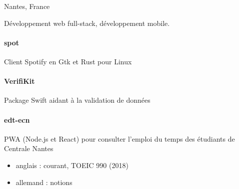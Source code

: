 \documentclass{cv}
\begin{document}
\begin{minipage}[t]{0.28\textwidth}%


	 Nantes, France
	\newline{} %
	\newline{} \href{mailto:%
	}{\link{%
	}}%
	\newline{} \href{https://github.com/xou816}{} 


	Développement web full-stack, développement mobile.

	\begin{center}
	  
	  
	  
	  
	  
	\end{center}

	\raggedright
	\paragraph{ spot} Client Spotify en Gtk et Rust pour Linux
	\paragraph{ VerifiKit} Package Swift aidant à la validation de données
	\paragraph{ edt-ecn} PWA (Node.js et React) pour consulter l'emploi du temps des étudiants de Centrale Nantes


	\begin{itemize}
	\item anglais : courant, TOEIC 990 (2018)
	\item allemand : notions
	\end{itemize}
		
\end{minipage}



\end{document}
